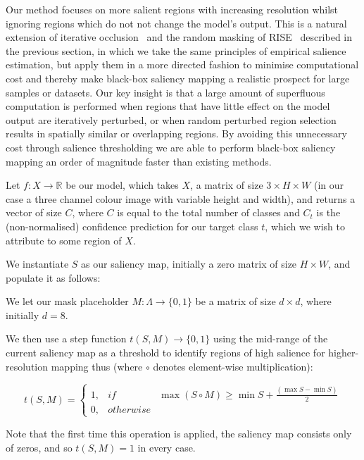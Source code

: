 \documentclass{article} %
\begin{document}
Our method focuses on more salient regions with increasing resolution whilst ignoring regions which do not not change the model’s output. This is a natural extension of iterative occlusion~\cite{Zeiler2013-lm} and the random masking of RISE~\cite{Petsiuk2018-wx} described in the previous section, in which we take the same principles of empirical salience estimation, but apply them in a more directed fashion to minimise computational cost and thereby make black-box saliency mapping a realistic prospect for large samples or datasets. Our key insight is that a large amount of superfluous computation is performed when regions that have little effect on the model output are iteratively perturbed, or when random perturbed region selection results in spatially similar or overlapping regions. By avoiding this unnecessary cost through salience thresholding we are able to perform black-box saliency mapping an order of magnitude faster than existing methods. 

Let $f:X \rightarrow \mathbb{R}$ be our model, which takes $X$, a matrix of size $3  \times H \times W$ (in our case a three channel colour image with variable height and width), and returns a vector of size $C$, where $C$ is equal to the total number of classes and $C_{t}$ is the (non-normalised) confidence prediction for our target class $t$, which we wish to attribute to some region of $X$.

We instantiate $S$ as our saliency map, initially a zero matrix of size $H \times W$, and populate it as follows:

We let our mask placeholder $M:\Lambda \rightarrow \{0,1\}$ be a matrix of size $d \times d$, where initially $d = 8$.

We then use a step function $t(S,M) \rightarrow \{0,1\}$ using the mid-range of the current saliency map as a threshold to identify regions of high salience for higher-resolution mapping thus (where $\circ$ denotes element-wise multiplication):

\begin{equation}
    t(S,M) = \left\{\begin{matrix}
    1, & if & \max{(S\circ M)}\geq \min{S} + \frac{(\max{S} - \min{S})}{2}\\
    0, & otherwise &
    \end{matrix}\right.
\end{equation}

Note that the first time this operation is applied, the saliency map consists only of zeros, and so $t(S,M) = 1$ in every case.
\end{document}
